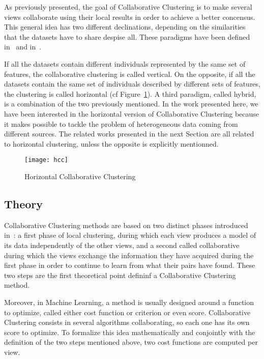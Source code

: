     As previously presented, the goal of Collaborative Clustering is to make several views collaborate using their local results in order to achieve a better concensus. This general idea has two different declinations, depending on the similarities that the datasets have to share despise all. These paradigms have been defined in~\cite{pedrycz2005knowledge} and in~\cite{grozavu2010topological}.

    If all the datasets contain different individuals represented by the same set of features, the collaborative clustering is called vertical. On the opposite, if all the datasets contain the same set of individuals described by different sets of features, the clustering is called horizontal (cf Figure~\ref{fig:hor_cc}). A third paradigm, called hybrid, is a combination of the two previously mentioned. In the work presented here, we have been interested in the horizontal version of Collaborative Clustering because it makes possible to tackle the problem of heterogeneous data coming from different sources. The related works presented in the next Section are all related to horizontal clustering, unless the opposite is explicitly mentionned.
    \vspace{.8cm}

        \begin{figure}[h]
            \centering
            \texttt{[image: hcc]}
            \caption{Horizontal Collaborative Clustering}
\label{fig:hor_cc}
        \end{figure}

    \subsection{Theory}
    
    Collaborative Clustering methods are based on two distinct phases introduced in~\cite{pedrycz2002collaborative}: a first phase of local clustering, during which each view produces a model of its data independently of the other views, and a second called collaborative during which the views exchange the information they have acquired during the first phase in order to continue to learn from what their pairs have found. These two steps are the first theoretical point defininf a Collaborative Clustering method.

    Moreover, in Machine Learning, a method is usually designed around a function to optimize, called either cost function or criterion or even score. Collaborative Clustering consists in several algorithms collaborating, so each one has its own score to optimize. To formalize this idea mathematically and conjointly with the definition of the two steps mentioned above, two cost functions are computed per view.

